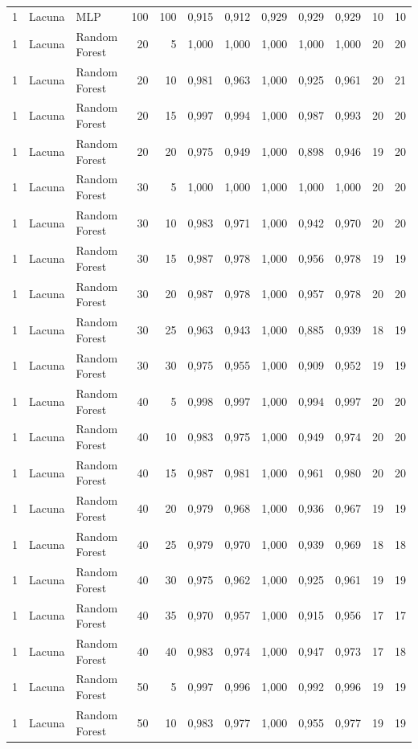 \begin{longtable}{@{}rllrrrrrrrrr@{}}
1 & Lacuna & MLP & 100 & 100 & 0,915 & 0,912 & 0,929 & 0,929 & 0,929 & 10 & 10 \\
1 & Lacuna & Random Forest & 20 & 5 & 1,000 & 1,000 & 1,000 & 1,000 & 1,000 & 20 & 20 \\
1 & Lacuna & Random Forest & 20 & 10 & 0,981 & 0,963 & 1,000 & 0,925 & 0,961 & 20 & 21 \\
1 & Lacuna & Random Forest & 20 & 15 & 0,997 & 0,994 & 1,000 & 0,987 & 0,993 & 20 & 20 \\
1 & Lacuna & Random Forest & 20 & 20 & 0,975 & 0,949 & 1,000 & 0,898 & 0,946 & 19 & 20 \\
1 & Lacuna & Random Forest & 30 & 5 & 1,000 & 1,000 & 1,000 & 1,000 & 1,000 & 20 & 20 \\
1 & Lacuna & Random Forest & 30 & 10 & 0,983 & 0,971 & 1,000 & 0,942 & 0,970 & 20 & 20 \\
1 & Lacuna & Random Forest & 30 & 15 & 0,987 & 0,978 & 1,000 & 0,956 & 0,978 & 19 & 19 \\
1 & Lacuna & Random Forest & 30 & 20 & 0,987 & 0,978 & 1,000 & 0,957 & 0,978 & 20 & 20 \\
1 & Lacuna & Random Forest & 30 & 25 & 0,963 & 0,943 & 1,000 & 0,885 & 0,939 & 18 & 19 \\
1 & Lacuna & Random Forest & 30 & 30 & 0,975 & 0,955 & 1,000 & 0,909 & 0,952 & 19 & 19 \\
1 & Lacuna & Random Forest & 40 & 5 & 0,998 & 0,997 & 1,000 & 0,994 & 0,997 & 20 & 20 \\
1 & Lacuna & Random Forest & 40 & 10 & 0,983 & 0,975 & 1,000 & 0,949 & 0,974 & 20 & 20 \\
1 & Lacuna & Random Forest & 40 & 15 & 0,987 & 0,981 & 1,000 & 0,961 & 0,980 & 20 & 20 \\
1 & Lacuna & Random Forest & 40 & 20 & 0,979 & 0,968 & 1,000 & 0,936 & 0,967 & 19 & 19 \\
1 & Lacuna & Random Forest & 40 & 25 & 0,979 & 0,970 & 1,000 & 0,939 & 0,969 & 18 & 18 \\
1 & Lacuna & Random Forest & 40 & 30 & 0,975 & 0,962 & 1,000 & 0,925 & 0,961 & 19 & 19 \\
1 & Lacuna & Random Forest & 40 & 35 & 0,970 & 0,957 & 1,000 & 0,915 & 0,956 & 17 & 17 \\
1 & Lacuna & Random Forest & 40 & 40 & 0,983 & 0,974 & 1,000 & 0,947 & 0,973 & 17 & 18 \\
1 & Lacuna & Random Forest & 50 & 5 & 0,997 & 0,996 & 1,000 & 0,992 & 0,996 & 19 & 19 \\
1 & Lacuna & Random Forest & 50 & 10 & 0,983 & 0,977 & 1,000 & 0,955 & 0,977 & 19 & 19 \\

\end{longtable}

